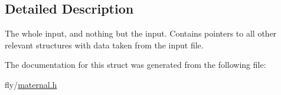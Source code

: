 \subsection{Detailed Description}
The whole input, and nothing but the input. Contains pointers to all other relevant structures with data taken from the input file. 

The documentation for this struct was generated from the following file:\begin{DoxyCompactItemize}
\item 
fly/\hyperlink{maternal_8h}{maternal.h}\end{DoxyCompactItemize}
